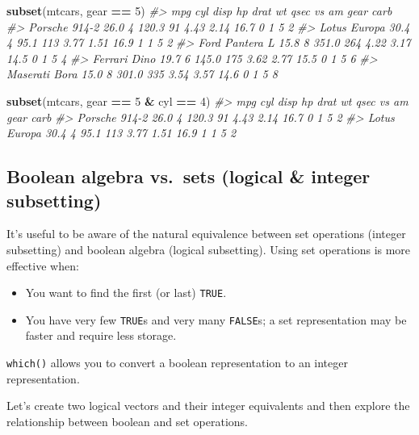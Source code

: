 \documentclass[]{book}
\newenvironment{Shaded}{\begin{snugshade}}{\end{snugshade}}
\newcommand{\KeywordTok}[1]{\textcolor[rgb]{0.13,0.29,0.53}{\textbf{#1}}}
\newcommand{\DecValTok}[1]{\textcolor[rgb]{0.00,0.00,0.81}{#1}}
\newcommand{\StringTok}[1]{\textcolor[rgb]{0.31,0.60,0.02}{#1}}
\newcommand{\CommentTok}[1]{\textcolor[rgb]{0.56,0.35,0.01}{\textit{#1}}}
\newcommand{\OperatorTok}[1]{\textcolor[rgb]{0.81,0.36,0.00}{\textbf{#1}}}
\newcommand{\NormalTok}[1]{#1}
\theoremstyle{definition}
\theoremstyle{definition}
\theoremstyle{definition}
\theoremstyle{remark}
\begin{document}
\begin{Shaded}
\begin{Highlighting}[]
\KeywordTok{subset}\NormalTok{(mtcars, gear }\OperatorTok{==}\StringTok{ }\DecValTok{5}\NormalTok{)}
\CommentTok{#>                 mpg cyl  disp  hp drat   wt qsec vs am gear carb}
\CommentTok{#> Porsche 914-2  26.0   4 120.3  91 4.43 2.14 16.7  0  1    5    2}
\CommentTok{#> Lotus Europa   30.4   4  95.1 113 3.77 1.51 16.9  1  1    5    2}
\CommentTok{#> Ford Pantera L 15.8   8 351.0 264 4.22 3.17 14.5  0  1    5    4}
\CommentTok{#> Ferrari Dino   19.7   6 145.0 175 3.62 2.77 15.5  0  1    5    6}
\CommentTok{#> Maserati Bora  15.0   8 301.0 335 3.54 3.57 14.6  0  1    5    8}

\KeywordTok{subset}\NormalTok{(mtcars, gear }\OperatorTok{==}\StringTok{ }\DecValTok{5} \OperatorTok{&}\StringTok{ }\NormalTok{cyl }\OperatorTok{==}\StringTok{ }\DecValTok{4}\NormalTok{)}
\CommentTok{#>                mpg cyl  disp  hp drat   wt qsec vs am gear carb}
\CommentTok{#> Porsche 914-2 26.0   4 120.3  91 4.43 2.14 16.7  0  1    5    2}
\CommentTok{#> Lotus Europa  30.4   4  95.1 113 3.77 1.51 16.9  1  1    5    2}
\end{Highlighting}
\end{Shaded}

\subsection{Boolean algebra vs.~sets (logical \& integer
subsetting)}\label{boolean-algebra-vs.sets-logical-integer-subsetting}

It's useful to be aware of the natural equivalence between set
operations (integer subsetting) and boolean algebra (logical
subsetting). Using set operations is more effective when:

\begin{itemize}
\item
  You want to find the first (or last) \texttt{TRUE}.
\item
  You have very few \texttt{TRUE}s and very many \texttt{FALSE}s; a set
  representation may be faster and require less storage.
\end{itemize}

\texttt{which()} allows you to convert a boolean representation to an
integer representation.

Let's create two logical vectors and their integer equivalents and then
explore the relationship between boolean and set operations.
\end{document}
